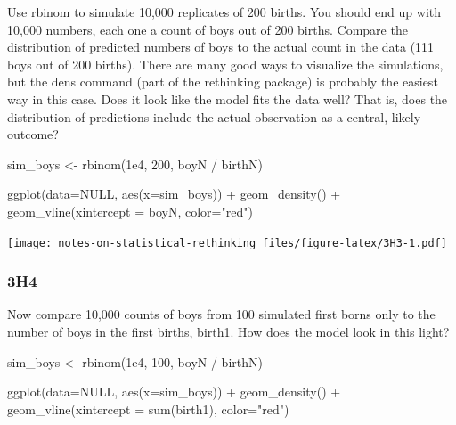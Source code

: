 \documentclass[
]{book}
\newenvironment{Shaded}{\begin{snugshade}}{\end{snugshade}}
\newcommand{\AttributeTok}[1]{\textcolor[rgb]{0.77,0.63,0.00}{#1}}
\newcommand{\ConstantTok}[1]{\textcolor[rgb]{0.00,0.00,0.00}{#1}}
\newcommand{\DecValTok}[1]{\textcolor[rgb]{0.00,0.00,0.81}{#1}}
\newcommand{\FloatTok}[1]{\textcolor[rgb]{0.00,0.00,0.81}{#1}}
\newcommand{\FunctionTok}[1]{\textcolor[rgb]{0.00,0.00,0.00}{#1}}
\newcommand{\NormalTok}[1]{#1}
\newcommand{\OtherTok}[1]{\textcolor[rgb]{0.56,0.35,0.01}{#1}}
\newcommand{\SpecialCharTok}[1]{\textcolor[rgb]{0.00,0.00,0.00}{#1}}
\newcommand{\StringTok}[1]{\textcolor[rgb]{0.31,0.60,0.02}{#1}}
\begin{document}
Use rbinom to simulate 10,000 replicates of 200 births. You should end up with 10,000 numbers, each one a count of boys out of 200 births. Compare the distribution of predicted numbers of boys to the actual count in the data (111 boys out of 200 births). There are many good ways to visualize the simulations, but the dens command (part of the rethinking package) is probably the easiest way in this case. Does it look like the model fits the data well? That is, does the distribution of predictions include the actual observation as a central, likely outcome?

\begin{Shaded}
\begin{Highlighting}[]
\NormalTok{sim\_boys }\OtherTok{\textless{}{-}} \FunctionTok{rbinom}\NormalTok{(}\FloatTok{1e4}\NormalTok{, }\DecValTok{200}\NormalTok{, boyN }\SpecialCharTok{/}\NormalTok{ birthN)}

\FunctionTok{ggplot}\NormalTok{(}\AttributeTok{data=}\ConstantTok{NULL}\NormalTok{, }\FunctionTok{aes}\NormalTok{(}\AttributeTok{x=}\NormalTok{sim\_boys)) }\SpecialCharTok{+} 
  \FunctionTok{geom\_density}\NormalTok{() }\SpecialCharTok{+} 
  \FunctionTok{geom\_vline}\NormalTok{(}\AttributeTok{xintercept =}\NormalTok{ boyN, }\AttributeTok{color=}\StringTok{"red"}\NormalTok{)}
\end{Highlighting}
\end{Shaded}

\texttt{[image: notes-on-statistical-rethinking\_files/figure-latex/3H3-1.pdf]}

\hypertarget{h4-1}{%
\subsubsection*{3H4}\label{h4-1}}

Now compare 10,000 counts of boys from 100 simulated first borns only to the number of boys in the first births, birth1. How does the model look in this light?

\begin{Shaded}
\begin{Highlighting}[]
\NormalTok{sim\_boys }\OtherTok{\textless{}{-}} \FunctionTok{rbinom}\NormalTok{(}\FloatTok{1e4}\NormalTok{, }\DecValTok{100}\NormalTok{, boyN }\SpecialCharTok{/}\NormalTok{ birthN)}

\FunctionTok{ggplot}\NormalTok{(}\AttributeTok{data=}\ConstantTok{NULL}\NormalTok{, }\FunctionTok{aes}\NormalTok{(}\AttributeTok{x=}\NormalTok{sim\_boys)) }\SpecialCharTok{+} 
  \FunctionTok{geom\_density}\NormalTok{() }\SpecialCharTok{+} 
  \FunctionTok{geom\_vline}\NormalTok{(}\AttributeTok{xintercept =} \FunctionTok{sum}\NormalTok{(birth1), }\AttributeTok{color=}\StringTok{"red"}\NormalTok{)}
\end{Highlighting}
\end{Shaded}
\end{document}

